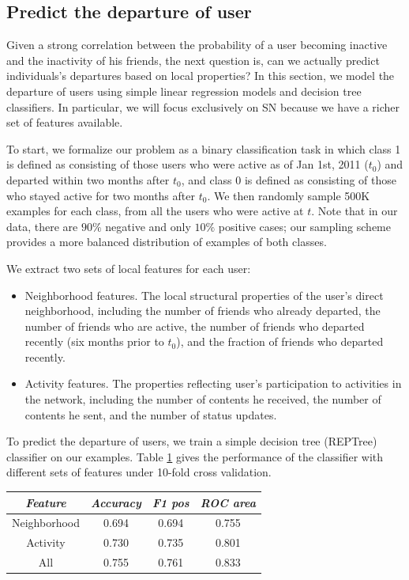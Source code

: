\documentclass[phd,tocprelim]{cornell}
\renewcommand{\caption}[1]{\singlespacing\hangcaption{#1}\normalspacing}
\begin{document}
\subsection{Predict the departure of user}
Given a strong correlation between the probability of a user becoming inactive and the inactivity of his friends, the next question is, can we actually predict individuals's departures based on local properties? In this section, we model the departure of users using simple linear regression models and decision tree classifiers. In particular, we will focus exclusively on SN because we have a richer set of features available.

To start, we formalize our problem as a binary classification task in which class 1 is defined as consisting of those users who were active as of Jan 1st, 2011 ($t_0$) and departed within two months after $t_0$, and class 0 is defined as consisting of those who stayed active for two months after $t_0$. We then randomly sample 500K examples for each class, from all the users who were active at $t$. Note that in our data, there are $90\%$ negative and only $10\%$ positive cases; our sampling scheme provides a more balanced distribution of examples of both classes. 

We extract two sets of local features for each user:
\begin{itemize}

	\item Neighborhood features. The local structural properties of the user's direct neighborhood, including the number of friends who already departed, the number of friends who are active, the number of friends who departed recently (six months prior to $t_0$), and the fraction of friends who departed recently.
\vspace{-8pt}

	\item Activity features. The properties reflecting user's participation to activities in the network, including the number of contents he received, the number of contents he sent, and the number of status updates.
\end{itemize}

To predict the departure of users, we train a simple decision tree (REPTree) classifier on our examples. Table \ref{table:departure-performance} gives the performance of the classifier with different sets of features under 10-fold cross validation. 

\begin{table}[t]
	\centering
	\caption{ \small Predict user departure with decision tree}
	\label{table:departure-performance}
	\begin{tabular}{c|c|c|c}
	\hline
	\emph{Feature} & \emph{Accuracy} & \emph{F1 pos} & \emph{ROC area}\\
	\hline
	Neighborhood & 0.694 & 0.694 & 0.755 \\
	\hline
	Activity & 0.730 & 0.735 & 0.801 \\
	\hline
	All & 0.755 & 0.761 & 0.833 \\
	\hline
	\end{tabular}
\end{table}
\end{document}

